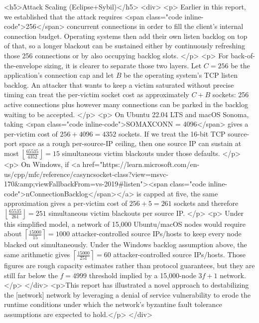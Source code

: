 \begin{rawhtml}
            <h5>Attack Scaling (Eclipse+Sybil)</h5>
            <div>
	            <p>
	            	Earlier in this report, we established that the attack requires <span class="code inline-code">256</span> concurrent connections in order to fill the client's internal connection budget. Operating systems then add their own listen backlog on top of that, so a longer blackout can be sustained either by continuously refreshing those 256 connections or by also occupying backlog slots.
	            </p>
	            <p>
	            	For back-of-the-envelope sizing, it is clearer to separate those two layers. Let $C = 256$ be the application's connection cap and let $B$ be the operating system's TCP listen backlog. An attacker that wants to keep a victim saturated without precise timing can treat the per-victim socket cost as approximately $C + B$ sockets: 256 active connections plus however many connections can be parked in the backlog waiting to be accepted.
	            </p>
	            <p>
		On Ubuntu 22.04 LTS and macOS Sonoma, taking <span class="code inline-code">SOMAXCONN = 4096</span> gives a per-victim cost of $256 + 4096 = 4352$ sockets. If we treat the 16-bit TCP source-port space as a rough per-source-IP ceiling, then one source IP can sustain at most $\left\lfloor \frac{65535}{4352} \right\rfloor = 15$ simultaneous victim blackouts under those defaults.
	            </p>
	            <p>
		On Windows, if <a href="https://learn.microsoft.com/en-us/cpp/mfc/reference/casyncsocket-class?view=msvc-170&amp;viewFallbackFrom=vs-2019#listen"><span class="code inline-code">nConnectionBacklog</span></a> is capped at five, the same approximation gives a per-victim cost of $256 + 5 = 261$ sockets and therefore $\left\lfloor \frac{65535}{261} \right\rfloor = 251$ simultaneous victim blackouts per source IP.
	            </p>
	            <p>
		Under this simplified model, a network of 15,000 Ubuntu/macOS nodes would require about $\left\lceil \frac{15000}{15} \right\rceil = 1000$ attacker-controlled source IPs/hosts to keep every node blacked out simultaneously. Under the Windows backlog assumption above, the same arithmetic gives $\left\lceil \frac{15000}{251} \right\rceil = 60$ attacker-controlled source IPs/hosts. Those figures are rough capacity estimates rather than protocol guarantees, but they are still far below the $f = 4999$ threshold implied by a 15,000-node $3f + 1$ network.
	            </p>
            </div>
	            <p>This report has illustrated a novel approach to destabilizing the [network] network by leveraging a denial of service vulnerability to erode the runtime conditions under which the network's byzantine fault tolerance assumptions are expected to hold.</p>
        </div>
\end{rawhtml}
